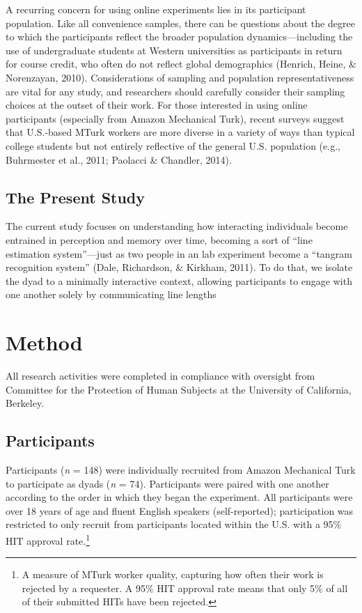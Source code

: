 \documentclass[10pt, letterpaper]{article}
\begin{document}
A recurring concern for using online experiments lies in its participant
population. Like all convenience samples, there can be questions about
the degree to which the participants reflect the broader population
dynamics---including the use of undergraduate students at Western
universities as participants in return for course credit, who often do
not reflect global demographics (Henrich, Heine, \& Norenzayan, 2010).
Considerations of sampling and population representativeness are vital
for any study, and researchers should carefully consider their sampling
choices at the outset of their work. For those interested in using
online participants (especially from Amazon Mechanical Turk), recent
surveys suggest that U.S.-based MTurk workers are more diverse in a
variety of ways than typical college students but not entirely
reflective of the general U.S. population (e.g., Buhrmester et al.,
2011; Paolacci \& Chandler, 2014).

\subsection{The Present Study}\label{the-present-study}

The current study focuses on understanding how interacting individuals
become entrained in perception and memory over time, becoming a sort of
``line estimation system''---just as two people in an lab experiment
become a ``tangram recognition system'' (Dale, Richardson, \& Kirkham,
2011). To do that, we isolate the dyad to a minimally interactive
context, allowing participants to engage with one another solely by
communicating line lengths

\section{Method}\label{method}

All research activities were completed in compliance with oversight from
Committee for the Protection of Human Subjects at the University of
California, Berkeley.

\subsection{Participants}\label{participants}

Participants (\emph{n} = 148) were individually recruited from Amazon
Mechanical Turk to participate as dyads (\emph{n} = 74). Participants
were paired with one another according to the order in which they began
the experiment. All participants were over 18 years of age and fluent
English speakers (self-reported); participation was restricted to only
recruit from participants located within the U.S. with a 95\% HIT
approval
rate.\footnote{A measure of MTurk worker quality, capturing how often their work is rejected by a requester. A 95\% HIT approval rate means that only 5\% of all of their submitted HITs have been rejected.}
\end{document}
